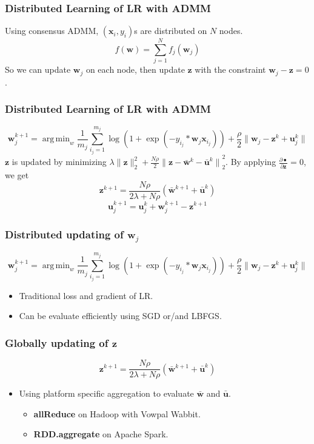 \documentclass{beamer}
\DeclareMathOperator*{\argmin}{arg\,min}
\begin{document}
\begin{frame}
\frametitle{Distributed Learning of LR with ADMM}
Using consensus ADMM, $(\mathbf{x}_i, y_i)$s are distributed on $N$ nodes.
$$f(\mathbf{w}) = \sum_{j=1}^N f_j(\mathbf{w}_j)$$
So we can update $\mathbf{w}_j$ on each node, then update $\mathbf{z}$ with the constraint $\mathbf{w}_j - \mathbf{z} = 0$.
\end{frame}

\begin{frame}
\frametitle{Distributed Learning of LR with ADMM}
$$\mathbf{w}_j^{k+1} = \argmin_w \frac{1}{m_j} \sum_{i_j = 1}^{m_j} \log(1 + \exp(-y_{i_j}*\mathbf{w}_j\mathbf{x}_{i_j})) + \frac{\rho}{2} {\|\mathbf{w}_j - \mathbf{z}^k + \mathbf{u}_j^k\|}$$
$\mathbf{z}$ is updated by minimizing $\lambda \|\mathbf{z}\|_2^2 + \frac{N\rho}{2}{\|\mathbf{z} - \bar{\mathbf{w}}^k - \bar{\mathbf{u}}^k\|}_2^2$. By applying $\frac{\partial \bullet}{\partial \mathbf{z}} = 0$, we get
$$\mathbf{z}^{k+1} = \frac{N\rho}{2\lambda + N\rho}(\bar{\mathbf{w}}^{k+1} + \bar{\mathbf{u}}^k)$$
$$\mathbf{u}_j^{k+1} = \mathbf{u}_j^k + \mathbf{w}_j^{k+1} - \mathbf{z}^{k+1}$$
\end{frame}



\begin{frame}
\frametitle{Distributed updating of $\mathbf{w}_j$}
$$\mathbf{w}_j^{k+1} = \argmin_w \frac{1}{m_j} \sum_{i_j = 1}^{m_j} \log(1 + \exp(-y_{i_j}*\mathbf{w}_j\mathbf{x}_{i_j})) + \frac{\rho}{2} {\|\mathbf{w}_j - \mathbf{z}^k + \mathbf{u}_j^k\|}$$
\begin{itemize}
\item Traditional loss and gradient of LR.
\item Can be evaluate efficiently using SGD or/and LBFGS.
\end{itemize}
\end{frame}

\begin{frame}
\frametitle{Globally updating of $\mathbf{z}$}
$$\mathbf{z}^{k+1} = \frac{N\rho}{2\lambda + N\rho} {(\bar{\mathbf{w}}^{k+1} + \bar{\mathbf{u}}^k)}$$
\begin{itemize}
\item Using platform specific aggregation to evaluate $\bar{\mathbf{w}}$ and $\bar{\mathbf{u}}$.
\begin{itemize}
\item \textbf{allReduce} on Hadoop with Vowpal Wabbit.
\item \textbf{RDD.aggregate} on Apache Spark.
\end{itemize}
\end{itemize}
\end{frame}
\end{document}
